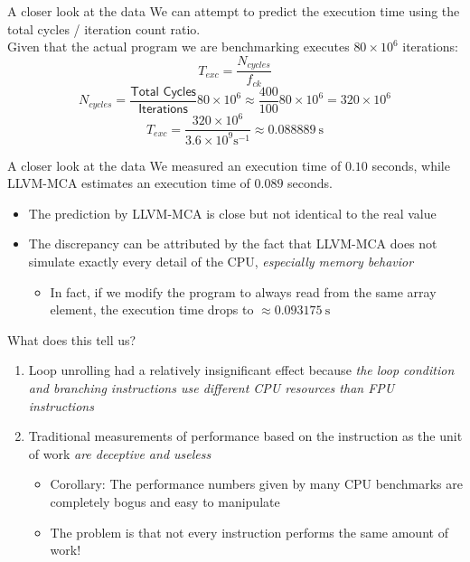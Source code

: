 \begin{frame}{A closer look at the data}
We can attempt to \alert{predict the execution time} using the total cycles / iteration count ratio.\\
\smallskip
Given that the actual program we are benchmarking executes $80\times10^{6}$ iterations:
\[
T_{exc} = \frac{N_{cycles}}{f_{ck}}
\]
\[
N_{cycles} = \frac{\textsf{Total Cycles}}{\textsf{Iterations}}80\times10^{6} \approx \frac{400}{100}80\times10^{6} = 320\times10^{6}
\]
\[
T_{exc} = \frac{320\times10^{6}}{3.6\times10^9 \si{\second}^{-1}} \approx \SI{0.088889}{\second}
\]
\end{frame}


\begin{frame}{A closer look at the data}
We measured an execution time of $0.10$ seconds, while LLVM-MCA estimates an execution time of $0.089$ seconds.
\bigskip
\begin{itemize}
\item The prediction by LLVM-MCA is close but not identical to the real value
\item The discrepancy can be attributed by the fact that LLVM-MCA does not simulate exactly every detail of the CPU, \emph{especially memory behavior}
	\begin{itemize}
	\item In fact, if we modify the program to always read from the same array element,
	the execution time drops to $\approx \SI{0.093175}{\second}$
	\end{itemize}
\end{itemize}
\end{frame}


\begin{frame}{What does this tell us?}
\large
\begin{enumerate}
\item Loop unrolling had a relatively insignificant effect because \emph{the loop condition and branching instructions use different CPU resources than FPU instructions}
\bigskip
\item Traditional measurements of performance based on the instruction as the unit of work \emph{are deceptive and useless}
	\medskip
	\begin{itemize}
	\item Corollary: The performance numbers given by many CPU benchmarks are completely bogus and easy to manipulate
	\item The problem is that not every instruction performs the same amount of work!
	\end{itemize}
\end{enumerate}
\end{frame}

